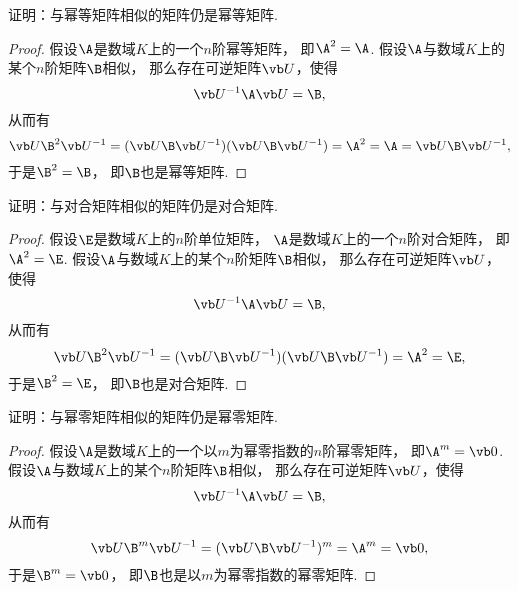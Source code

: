 \begin{example}\label{example:幂等矩阵.幂等矩阵的相似类}
证明：与幂等矩阵相似的矩阵仍是幂等矩阵.
\begin{proof}
假设\(\A\)是数域\(K\)上的一个\(n\)阶幂等矩阵，
即\(\A^2=\A\).
假设\(\A\)与数域\(K\)上的某个\(n\)阶矩阵\(\B\)相似，
那么存在可逆矩阵\(\P\)，使得\[
	\P^{-1}\A\P = \B,
\]
从而有\[
	\P\B^2\P^{-1}
	= (\P\B\P^{-1})(\P\B\P^{-1})
	= \A^2
	= \A
	= \P\B\P^{-1},
\]
于是\(\B^2=\B\)，
即\(\B\)也是幂等矩阵.
\end{proof}
\end{example}
\begin{example}\label{example:对合矩阵.对合矩阵的相似类}
证明：与对合矩阵相似的矩阵仍是对合矩阵.
\begin{proof}
假设\(\E\)是数域\(K\)上的\(n\)阶单位矩阵，
\(\A\)是数域\(K\)上的一个\(n\)阶对合矩阵，
即\(\A^2=\E\).
假设\(\A\)与数域\(K\)上的某个\(n\)阶矩阵\(\B\)相似，
那么存在可逆矩阵\(\P\)，使得\[
	\P^{-1}\A\P = \B,
\]
从而有\[
	\P\B^2\P^{-1}
	= (\P\B\P^{-1})(\P\B\P^{-1})
	= \A^2
	= \E,
\]
于是\(\B^2=\E\)，
即\(\B\)也是对合矩阵.
\end{proof}
\end{example}
\begin{example}\label{example:幂零矩阵.幂零矩阵的相似类}
证明：与幂零矩阵相似的矩阵仍是幂零矩阵.
\begin{proof}
假设\(\A\)是数域\(K\)上的一个以\(m\)为幂零指数的\(n\)阶幂零矩阵，
即\(\A^m=\vb0\).
假设\(\A\)与数域\(K\)上的某个\(n\)阶矩阵\(\B\)相似，
那么存在可逆矩阵\(\P\)，使得\[
	\P^{-1}\A\P = \B,
\]
从而有\[
	\P\B^m\P^{-1}
	= (\P\B\P^{-1})^m
	= \A^m
	= \vb0,
\]
于是\(\B^m=\vb0\)，
即\(\B\)也是以\(m\)为幂零指数的幂零矩阵.
\end{proof}
\end{example}
